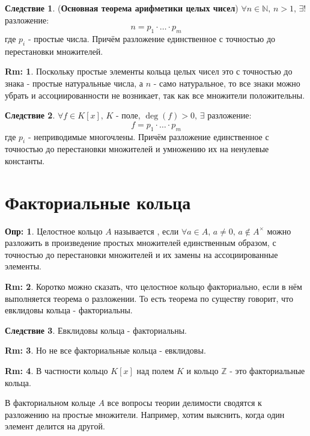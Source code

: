 \documentclass[12pt]{article}
\newcommand{\MN}{\mathbb{N}}
\newcommand{\MZ}{\mathbb{Z}}
\theoremstyle{definition}
\newtheorem{defn}{Опр:}
\newtheorem{rem}{Rm:}
\newtheorem{corollary}{Следствие}
\begin{document}
\begin{corollary}(\textbf{Основная теорема арифметики целых чисел})
	$\forall n \in \MN, \, n > 1, \, \exists!$ разложение: 
	$$
		n = p_1{\cdot}\dotsc{\cdot}p_m
	$$ 
	где $p_i$ - простые числа. Причём разложение единственное с точностью до перестановки множителей.
\end{corollary}
\begin{rem}
	Поскольку простые элементы кольца целых чисел это с точностью до знака - простые натуральные числа, а $n$ - само натуральное, то все знаки можно убрать и ассоциированности не возникает, так как все множители положительны. 
\end{rem}
\begin{corollary}
	$\forall f \in K[x], \, K$ - поле, $\deg(f) > 0, \,  \exists$ разложение: 
	$$
		f = p_1{\cdot}\dotsc{\cdot}p_m	
	$$ 
	где $p_i$ - неприводимые многочлены. Причём разложение единственное с точностью до перестановки множителей и умножению их на ненулевые константы.
\end{corollary}

\section*{Факториальные кольца}

\begin{defn}
	Целостное кольцо $A$ называется , если $\forall a \in A, \, a\neq 0, \, a\not\in A^{\times}$ можно разложить в произведение простых множителей единственным образом, с точностью до перестановки множителей и их замены на ассоциированные элементы.
\end{defn}
\begin{rem}
	Коротко можно сказать, что целостное кольцо факториально, если в нём выполняется теорема о разложении. То есть теорема по существу говорит, что евклидовы кольца - факториальны.
\end{rem}
\begin{corollary}
	Евклидовы кольца - факториальны.
\end{corollary}
\begin{rem}
	Но не все факториальные кольца - евклидовы.
\end{rem}
\begin{rem}
	В частности кольцо $K[x]$ над полем $K$ и кольцо $\MZ$ - это факториальные кольца.
\end{rem}
В факториальном кольце $A$ все вопросы теории делимости сводятся к разложению на простые множители. Например, хотим выяснить, когда один элемент делится на другой.
\end{document}
